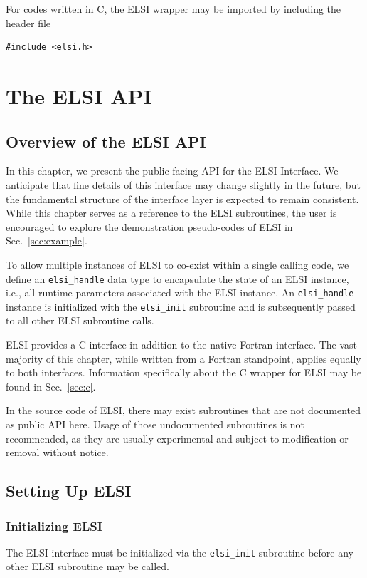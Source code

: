 \documentclass{report}
\begin{document}
For codes written in C, the ELSI wrapper may be imported by including the header file
\begin{tcolorbox}
\begin{verbatim}
#include <elsi.h>
\end{verbatim}
\end{tcolorbox}

\chapter{The ELSI API}
\section{Overview of the ELSI API}
\label{sec:api}
In this chapter, we present the public-facing API for the ELSI Interface. We anticipate that fine details of this interface may change slightly in the future, but the fundamental structure of the interface layer is expected to remain consistent. While this chapter serves as a reference to the ELSI subroutines, the user is encouraged to explore the demonstration pseudo-codes of ELSI in Sec.~\ref{sec:example}.

To allow multiple instances of ELSI to co-exist within a single calling code, we define an \texttt{elsi\_handle} data type to encapsulate the state of an ELSI instance, i.e., all runtime parameters associated with the ELSI instance. An \texttt{elsi\_handle} instance is initialized with the \texttt{elsi\_init} subroutine and is subsequently passed to all other ELSI subroutine calls.

ELSI provides a C interface in addition to the native Fortran interface. The vast majority of this chapter, while written from a Fortran standpoint, applies equally to both interfaces. Information specifically about the C wrapper for ELSI may be found in Sec.~\ref{sec:c}.

In the source code of ELSI, there may exist subroutines that are not documented as public API here. Usage of those undocumented subroutines is not recommended, as they are usually experimental and subject to modification or removal without notice.

\section{Setting Up ELSI}
\label{sec:setup}
\subsection{Initializing ELSI}
\label{subsec:setup_init}
The ELSI interface must be initialized via the \texttt{elsi\_init} subroutine before any other ELSI subroutine may be called.
\end{document}

